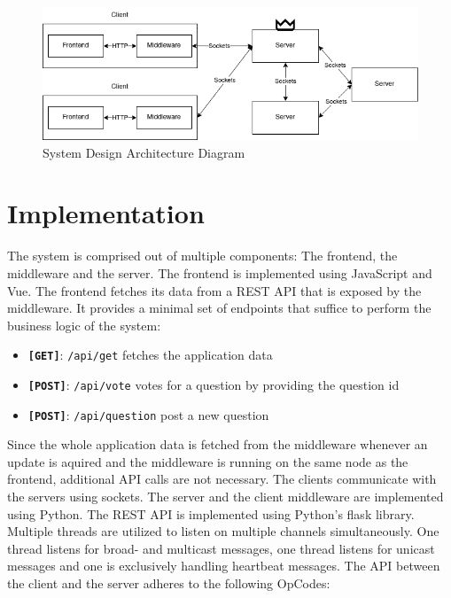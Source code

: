 \documentclass[runningheads]{llncs}
\begin{document}
\begin{figure}
    \centering
    \includegraphics[width=\linewidth]{question_hub_architecture_final.drawio.png}
    \caption{System Design Architecture Diagram}
    \label{fig:enter-label}
\end{figure}

\section{Implementation}

The system is comprised out of multiple components: The frontend, the
middleware and the server. The frontend is implemented using JavaScript and
Vue. The frontend fetches its data from a REST API that is exposed by the
middleware. It provides a minimal set of endpoints that suffice to perform the
business logic of the system: 

\begin{itemize}
    \item \textbf{\texttt{[GET]}}: \texttt{/api/get} fetches the application data
    \item \textbf{\texttt{[POST]}}: \texttt{/api/vote} votes for a question by providing the question id
    \item \textbf{\texttt{[POST]}}: \texttt{/api/question} post a new question
\end{itemize}

Since the whole application data is fetched from the middleware whenever an
update is aquired and the middleware is running on the same node as the
frontend, additional API calls are not necessary.
\newline
\newline
The clients communicate with the servers using sockets. The server and the
client middleware are implemented using Python. The REST API is implemented
using Python's flask library. Multiple threads are utilized to listen on
multiple channels simultaneously. One thread listens for broad- and multicast
messages, one thread listens for unicast messages and one is exclusively
handling heartbeat messages.
\newline
\newline
The API between the client and the server adheres to the following OpCodes:
\end{document}
